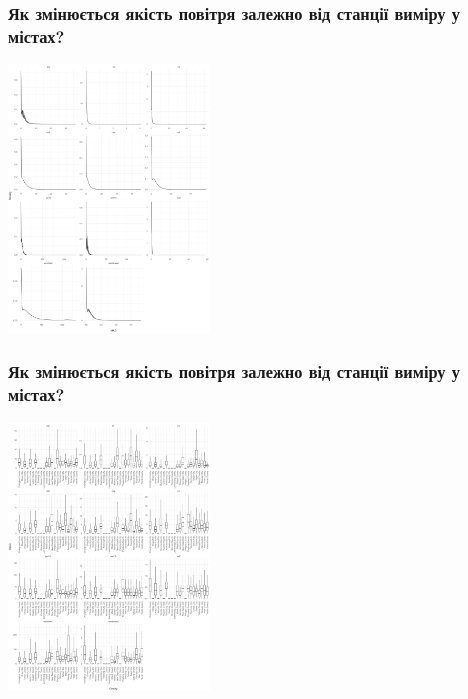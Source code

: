 \documentclass{beamer}
\begin{document}
\begin{frame}
  \frametitle{Як змінюється якість повітря залежно від станції виміру у містах?}

  \begin{center}
    \includegraphics[height=2.8in]{plots/question7/density.png}
  \end{center}

\end{frame}

\begin{frame}
  \frametitle{Як змінюється якість повітря залежно від станції виміру у містах?}

  \begin{center}
    \includegraphics[height=2.8in]{plots/question7/box-county.png}
  \end{center}
\end{frame}
\end{document}

